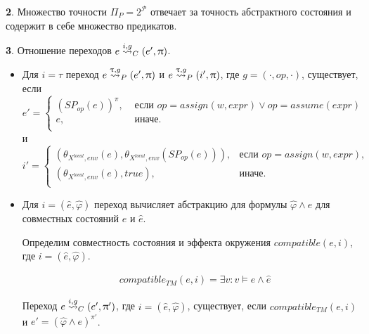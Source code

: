 {\textbf 2.} Множество точности $\Pi_P = 2^\mathscr{P}$ отвечает за точность абстрактного состояния и содержит в себе множество предикатов.

{\textbf 3.} Отношение переходов $e \stackrel{i,g}{\leadsto}_C (e',\uppi)$.

\begin{itemize}
\item Для $i=\tau$ переход $e \stackrel{\uptau, g}{\leadsto}_{P} (e', \uppi)$ и $e \stackrel{\uptau, g}{\leadsto}_{P} (i', \uppi)$, где $g = (\cdot, op, \cdot)$, существует, если
$$e'= 
\left\lbrace\begin{array}{ll}
(SP_{op}(e))^\pi, & \mbox{ если } op=assign(w, expr) \lor op=assume(expr)\\
e, &\mbox{ иначе}.\\
\end{array}
\right.
$$
и 
$$i'= 
\left\lbrace
\begin{array}{ll}
(\theta_{X^{local},env}(e),\theta_{X^{local},env}(SP_{op}(e))),&\mbox{если } op=assign(w, expr),\\
(\theta_{X^{local},env}(e),true),&\mbox{иначе}.\\
\end{array}
\right.
$$


\item Для $i=(\hat e,\hat \varphi)$ переход вычисляет абстракцию для формулы $\hat \varphi \land e$ для совместных состояний $e$ и $\hat e$.

Определим совместность состояния и эффекта окружения $compatible(e, i)$, где  $i=(\hat e,\hat \varphi)$.

\begin{equation}
\label{cpa_predicate_compatible}
\begin{aligned}
& compatible_{TM}(e, i) = \exists v: v \models e \land \hat e
\end{aligned}
\end{equation}

Переход $e \stackrel{i, g}{\leadsto}_{C} (e', \uppi')$, где $i=(\hat e,\hat \varphi)$, существует, если
$compatible_{TM}(e,i)$ и $e'= (\hat \varphi \land e)^{\pi'}$.
\end{itemize}


